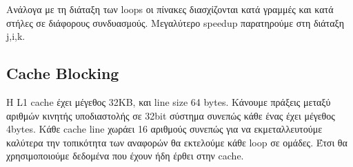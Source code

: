 \documentclass[a4paper,12pt]{article}
\begin{document}
Ανάλογα με τη διάταξη των loops οι πίνακες διασχίζονται κατά γραμμές και κατά
στήλες σε διάφορους συνδυασμούς. Μεγαλύτερο speedup παρατηρούμε στη διάταξη
j,i,k.


\pagebreak


\subsection{Cache Blocking}

Η L1 cache έχει μέγεθος 32KB, και line size 64 bytes. Κάνουμε πράξεις μεταξύ
αριθμών κινητής υποδιαστολής σε 32bit σύστημα συνεπώς κάθε ένας έχει μέγεθος
4bytes. Κάθε cache line χωράει 16 αριθμούς συνεπώς για να εκμεταλλευτούμε
καλύτερα την τοπικότητα των αναφορών θα εκτελούμε κάθε loop σε ομάδες. Έτσι θα 
χρησιμοποιούμε δεδομένα που έχουν ήδη έρθει στην cache.

\inputminted[linenos,fontsize=\scriptsize,frame=leftline]{c}{files/partA2_scan-v3-partA.c}
\end{document}
